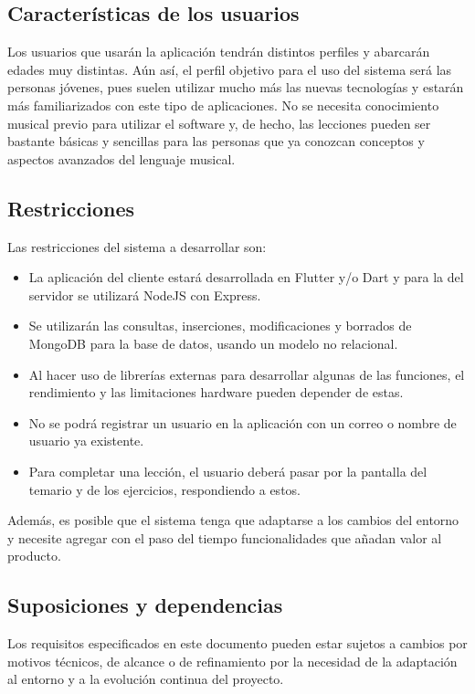 \subsection{Características de los usuarios}
Los usuarios que usarán la aplicación tendrán distintos perfiles y abarcarán edades muy distintas. Aún así,
el perfil objetivo para el uso del sistema será las personas jóvenes, pues suelen utilizar mucho más las nuevas tecnologías
y estarán más familiarizados con este tipo de aplicaciones. No se necesita conocimiento musical previo para utilizar el software y, 
de hecho, las lecciones pueden ser bastante básicas y sencillas para las personas que ya conozcan conceptos y aspectos avanzados del lenguaje musical.


\subsection{Restricciones}

Las restricciones del sistema a desarrollar son:
\begin{itemize}
    \item La aplicación del cliente estará desarrollada en Flutter y/o Dart y para la del servidor se utilizará NodeJS con Express.
    \item Se utilizarán las consultas, inserciones, modificaciones y borrados de MongoDB para la base de datos, usando un modelo no relacional.
    \item Al hacer uso de librerías externas para desarrollar algunas de las funciones, el rendimiento y las limitaciones hardware pueden depender de estas.
    \item No se podrá registrar un usuario en la aplicación con un correo o nombre de usuario ya existente.
    \item Para completar una lección, el usuario deberá pasar por la pantalla del temario y de los ejercicios, respondiendo a estos.
\end{itemize}


Además, es posible que el sistema tenga que adaptarse a los cambios del entorno y necesite agregar con el paso del tiempo funcionalidades que añadan valor
al producto. 


\subsection{Suposiciones y dependencias}
Los requisitos especificados en este documento pueden estar sujetos a cambios por motivos técnicos, de alcance o de refinamiento por la necesidad de la adaptación
al entorno y a la evolución continua del proyecto. 


